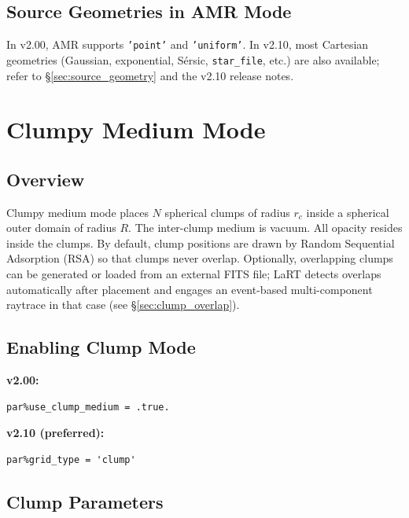 \documentclass[english,a4paper]{my_memo}
\begin{document}
\subsection{Source Geometries in AMR Mode}

In v2.00, AMR supports \texttt{'point'} and \texttt{'uniform'}.  In v2.10, most
Cartesian geometries (Gaussian, exponential, S\'{e}rsic, \texttt{star\_file}, etc.)
are also available; refer to \S\ref{sec:source_geometry} and the v2.10 release notes.

\section{Clumpy Medium Mode}
\label{sec:clump}

\subsection{Overview}

Clumpy medium mode places $N$ spherical clumps of radius $r_c$ inside a spherical outer
domain of radius $R$.  The inter-clump medium is vacuum.  All opacity resides inside the
clumps.  By default, clump positions are drawn by Random Sequential Adsorption (RSA) so
that clumps never overlap.  Optionally, overlapping clumps can be generated or loaded from
an external FITS file; LaRT detects overlaps automatically after placement and engages an
event-based multi-component raytrace in that case (see \S\ref{sec:clump_overlap}).

\subsection{Enabling Clump Mode}

\textbf{v2.00:}
\begin{lstlisting}
par%use_clump_medium = .true.
\end{lstlisting}

\textbf{v2.10 (preferred):}
\begin{lstlisting}
par%grid_type = 'clump'
\end{lstlisting}

\subsection{Clump Parameters}
\end{document}

